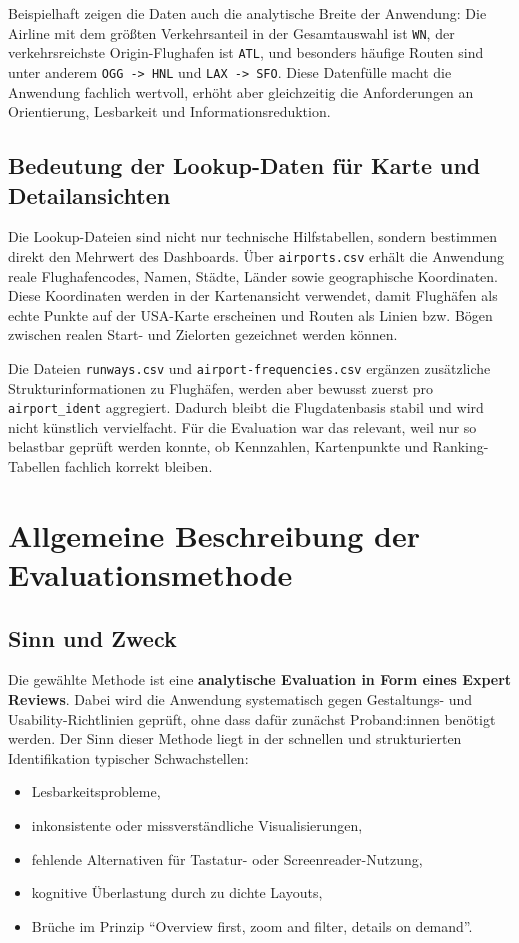 \documentclass[11pt,a4paper]{article}
\begin{document}
Beispielhaft zeigen die Daten auch die analytische Breite der Anwendung: Die Airline mit dem größten Verkehrsanteil in der Gesamtauswahl ist \texttt{WN}, der verkehrsreichste Origin-Flughafen ist \texttt{ATL}, und besonders häufige Routen sind unter anderem \texttt{OGG -> HNL} und \texttt{LAX -> SFO}. Diese Datenfülle macht die Anwendung fachlich wertvoll, erhöht aber gleichzeitig die Anforderungen an Orientierung, Lesbarkeit und Informationsreduktion.

\subsection{Bedeutung der Lookup-Daten für Karte und Detailansichten}
Die Lookup-Dateien sind nicht nur technische Hilfstabellen, sondern bestimmen direkt den Mehrwert des Dashboards. Über \texttt{airports.csv} erhält die Anwendung reale Flughafencodes, Namen, Städte, Länder sowie geographische Koordinaten. Diese Koordinaten werden in der Kartenansicht verwendet, damit Flughäfen als echte Punkte auf der USA-Karte erscheinen und Routen als Linien bzw. Bögen zwischen realen Start- und Zielorten gezeichnet werden können.

Die Dateien \texttt{runways.csv} und \texttt{airport-frequencies.csv} ergänzen zusätzliche Strukturinformationen zu Flughäfen, werden aber bewusst zuerst pro \texttt{airport\_ident} aggregiert. Dadurch bleibt die Flugdatenbasis stabil und wird nicht künstlich vervielfacht. Für die Evaluation war das relevant, weil nur so belastbar geprüft werden konnte, ob Kennzahlen, Kartenpunkte und Ranking-Tabellen fachlich korrekt bleiben.

\section{Allgemeine Beschreibung der Evaluationsmethode}
\subsection{Sinn und Zweck}
Die gewählte Methode ist eine \textbf{analytische Evaluation in Form eines Expert Reviews}. Dabei wird die Anwendung systematisch gegen Gestaltungs- und Usability-Richtlinien geprüft, ohne dass dafür zunächst Proband:innen benötigt werden. Der Sinn dieser Methode liegt in der schnellen und strukturierten Identifikation typischer Schwachstellen:

\begin{itemize}[leftmargin=1.2cm]
\item Lesbarkeitsprobleme,
\item inkonsistente oder missverständliche Visualisierungen,
\item fehlende Alternativen für Tastatur- oder Screenreader-Nutzung,
\item kognitive Überlastung durch zu dichte Layouts,
\item Brüche im Prinzip ``Overview first, zoom and filter, details on demand''.
\end{itemize}
\end{document}
